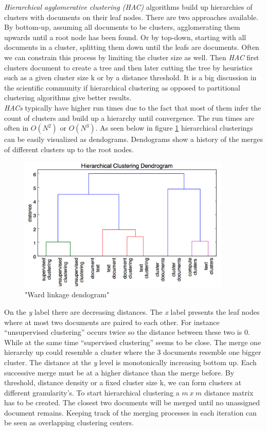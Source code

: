    \emph{Hierarchical agglomerative clustering (HAC)} algorithms build up hierarchies of clusters with  documents on their leaf nodes. There are two approaches available. By bottom-up, assuming all documents to be clusters, agglomerating them upwards until a root node has been found. Or by top-down, starting with all documents in a cluster, splitting them down until the leafs are documents. Often we can constrain this process by limiting the cluster size as well. Then \emph{HAC} first clusters document to create a tree and then later cutting the tree by heuristics such as a given cluster size k or by a distance threshold. It is a big discussion in the scientific community if hierarchical clustering as opposed to partitional clustering algorithms give better results. \cite[chp. 17]{IRBook2008}\\
    \emph{HACs} typically have higher run times due to the fact that most of them infer the count of clusters and build up a hierarchy until convergence. The run times are often in $O(N^2)$ or $O(N^3)$. As seen below in figure \ref{hac_dendogram} hierarchical clusterings can be easily visualized as dendograms. Dendograms show a history of the merges of different clusters up to the root nodes.

    \begin{figure}[h!]
      \centering
        \includegraphics[width=0.9\textwidth]{dendogram.png}
        \caption{"Ward linkage dendogram"}
        \label{hac_dendogram}
    \end{figure}

    On the \emph{y} label there are decreasing distances. The \emph{x} label presents the leaf nodes where at most two documents are paired to each other. For instance ``unsupervised clustering'' occurs twice so the distance between these two is 0. While at the same time ``supervised clustering'' seems to be close. The merge one hierarchy up could resemble a cluster where the 3 documents resemble one bigger cluster. The distance at the \emph{y} level is monotonically increasing bottom up. Each successive merge must be at a higher distance than the merge before. By threshold, distance density or a fixed cluster size k, we can form clusters at different granularity's. To start hierarchical clustering a $m\:x\:m$ distance matrix has to be created. The closest two documents will be merged until no unassigned document remains. Keeping track of the merging processes in each iteration can be seen as overlapping clustering centers.\\

